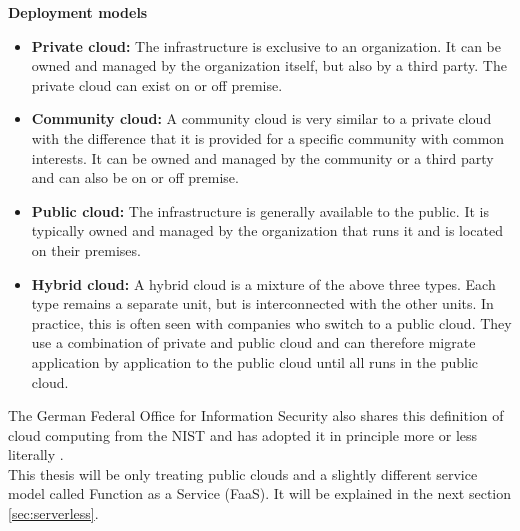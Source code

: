 \textbf{Deployment models} \cite{Mell:2011:SND:2206223}
\begin{itemize}
    \item \textbf{Private cloud:} The infrastructure is exclusive to an organization. It can be owned and managed by the organization itself, but also by a third party. The private cloud can exist on or off premise.
    \item \textbf{Community cloud:} A community cloud is very similar to a private cloud with the difference that it is provided for a specific community with common interests. It can be owned and managed by the community or a third party and can also be on or off premise.
    \item \textbf{Public cloud:} The infrastructure is generally available to the public. It is typically owned and managed by the organization that runs it and is located on their premises.
    \item \textbf{Hybrid cloud:} A hybrid cloud is a mixture of the above three types. Each type remains a separate unit, but is interconnected with the other units. In practice, this is often seen with companies who switch to a public cloud. They use a combination of private and public cloud and can therefore migrate application by application to the public cloud until all runs in the public cloud.
\end{itemize}
The German Federal Office for Information Security also shares this definition of cloud computing from the \gls{NIST} and has adopted it in principle more or less literally \cite{BSICC}.\\
This thesis will be only treating public clouds and a slightly different service model called Function as a Service (\gls{FaaS}). It will be explained in the next section \ref{sec:serverless}.

